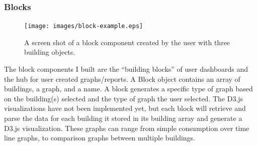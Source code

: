\documentclass[letterpaper,10pt,serif,draftclsnofoot,onecolumn,compsoc,titlepage]{IEEEtran}
\begin{document}
\subsubsection{Blocks}
\begin{figure}[H]
  \centering
  \texttt{[image: images/block-example.eps]}
  \caption{A screen shot of a block component created by the user with three building objects.}
\end{figure}
The block components I built are the ``building blocks'' of user dashboards and the hub for user created graphs/reports. A Block object contains an array of buildings, a graph, and a name. A block generates a specific type of graph based on the building(s) selected and the type of graph the user selected. The D3.js visualizations have not been implemented yet, but each block will retrieve and parse the data for each building it stored in its building array and generate a D3.js visualization. These graphs can range from simple consumption over time line graphs, to comparison graphs between multiple buildings.\\
\end{document}

